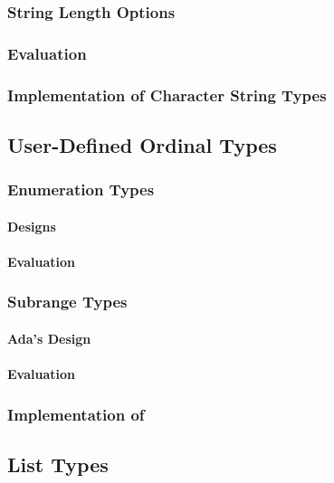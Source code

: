 \subsubsection{String Length Options}\label{subsubsec:String_Type_Length_Options}
\subsubsection{Evaluation}\label{subsubsec:String_Type_Evaluation}
\subsubsection{Implementation of Character String Types}\label{subsubsec:Implementation_of_Character_String_Types}

\subsection{User-Defined Ordinal Types}\label{subsec:User_Defined_Ordinal_Types}
\subsubsection{Enumeration Types}\label{subsubsec:Enumeration_Types}
\paragraph{Designs}\label{par:Enumeration_Types_Designs}
\paragraph{Evaluation}\label{par:Enumeration_Types_Evaluation}

\subsubsection{Subrange Types}\label{subsubsec:Subrange_Types}
\paragraph{Ada's Design}\label{par:Adas_Subrange_Types_Design}
\paragraph{Evaluation}\label{par:Subrange_Types_Evaluation}

\subsubsection{Implementation of }\label{subsubsec:Implementation_User_Defined_Ordinal_Types}

\subsection{List Types}\label{subsec:List_Types}



